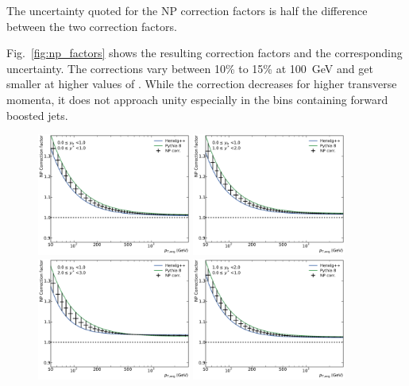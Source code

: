 The uncertainty quoted for the NP correction factors is half the difference
between the two correction factors.

Fig.~\ref{fig:np_factors} shows the resulting correction factors and the
corresponding uncertainty. The corrections vary between 10\% to 15\% at
\SI{100}{\GeV} and get smaller at higher values of \ptavg. While the correction
decreases for higher transverse momenta, it does not approach unity especially
in the bins containing forward boosted jets. 

\begin{figure}[htp]
    \centering
    \includegraphics[width=0.45\textwidth]{figures/theory/np_factors_calc_yb0ys0.pdf}\hfill
    \includegraphics[width=0.45\textwidth]{figures/theory/np_factors_calc_yb0ys1.pdf}
    \includegraphics[width=0.45\textwidth]{figures/theory/np_factors_calc_yb0ys2.pdf}\hfill
    \includegraphics[width=0.45\textwidth]{figures/theory/np_factors_calc_yb1ys0.pdf}

\end{figure}
